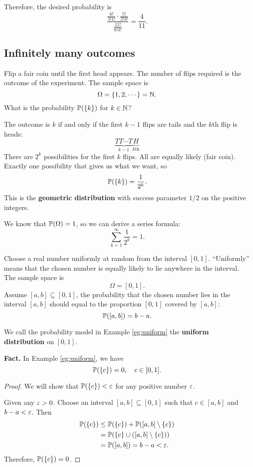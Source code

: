   Therefore, the desired probability is
  \[
    \frac{\frac{6!}{5!1!}\cdot \frac{5!}{2!3!}}{\frac{11!}{8!3!}} = \frac{4}{11}.
  \]
  
  
  \subsection{Infinitely many outcomes}
  \label{subsec:1.3}
  \begin{example}
    Flip a fair coin until the first head appears. The number of flips required
    is the outcome of the experiment. The sample space is
    \[
      \Omega = \{1, 2,\cdots\} = \mathbb{N}.
    \]
    What is the probability $\mathbb{P}(\{k\})$ for $k\in \mathbb{N}$?
  \end{example}
  The outcome is $k$ if and only if the first $k-1$ flips are tails and the
  $k$th flip is heads:
  \[
    \underbrace{TT\cdots T}_{k-1}\underbrace{H}_{k\text{th}}
  \]
  There are $2^k$ possibilities for the first $k$ flips. All are equally likely
  (fair coin). Exactly one possibility that gives us what we want, so
  \[
    \mathbb{P}(\{k\}) = \frac{1}{2^k}.
  \]
  This is the \textbf{geometric distribution} with success parameter $1/2$ on
  the positive integers.
  \begin{remark}
    We know that $\mathbb{P}(\Omega) = 1$, so we can derive a series formula:
    \[
      \sum_{k=1}^\infty \frac{1}{2^k} = 1.
    \]
  \end{remark}
  \begin{example}
    \label{eg:uniform}
    Choose a real number uniformly at random from the interval $[0,1]$.
    ``Uniformly'' means that the chosen number is equally likely to lie
    anywhere in the interval. The sample space is
    \[
      \Omega=[0,1].
    \]
    Assume $[a,b]\subseteq [0,1]$, the probability that the chosen number lies
    in the interval $[a,b]$ should equal to the proportion $[0,1]$ covered by
    $[a,b]$:
    \[
      \mathbb{P}([a,b])=b-a.
    \]
  \end{example}
    We call the probability model in Example \ref{eg:uniform} the
    \textbf{uniform distribution} on $[0,1]$.

    \textbf{Fact.} In Example \ref{eg:uniform}, we have
    \[
      \mathbb{P}(\{c\}) = 0,\quad c\in [0,1].
    \]
    \begin{proof}
      We will show that $\mathbb{P}(\{c\})<\varepsilon$ for any positive number $\varepsilon$.

      Given any $\varepsilon>0$. Choose an interval $[a,b]\subseteq [0,1]$ such that
      $c\in [a,b]$ and $b-a<\varepsilon$. Then
      \begin{align*}
        \mathbb{P}(\{c\})
        & \le \mathbb{P}(\{c\}) + \mathbb{P}([a,b]\setminus \{c\}) \\
        & = \mathbb{P}(\{c\} \cup ([a,b]\setminus \{c\}))\\
        & = \mathbb{P}([a,b]) = b-a<\varepsilon.
      \end{align*}
      Therefore, $\mathbb{P}(\{c\}) = 0$.
    \end{proof}
 
